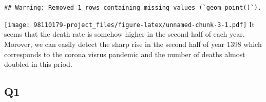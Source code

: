 \documentclass[
]{article}
\newenvironment{Shaded}{\begin{snugshade}}{\end{snugshade}}
\newcommand{\AttributeTok}[1]{\textcolor[rgb]{0.77,0.63,0.00}{#1}}
\newcommand{\CommentTok}[1]{\textcolor[rgb]{0.56,0.35,0.01}{\textit{#1}}}
\newcommand{\DecValTok}[1]{\textcolor[rgb]{0.00,0.00,0.81}{#1}}
\newcommand{\FunctionTok}[1]{\textcolor[rgb]{0.00,0.00,0.00}{#1}}
\newcommand{\NormalTok}[1]{#1}
\newcommand{\OtherTok}[1]{\textcolor[rgb]{0.56,0.35,0.01}{#1}}
\newcommand{\SpecialCharTok}[1]{\textcolor[rgb]{0.00,0.00,0.00}{#1}}
\newcommand{\StringTok}[1]{\textcolor[rgb]{0.31,0.60,0.02}{#1}}
\begin{document}
\begin{Shaded}
\end{Shaded}

\begin{verbatim}
## Warning: Removed 1 rows containing missing values (`geom_point()`).
\end{verbatim}

\texttt{[image: 98110179-project\_files/figure-latex/unnamed-chunk-3-1.pdf]}
It seems that the death rate is somehow higher in the second half of
each year. Morover, we can easily detect the sharp rise in the second
half of year 1398 which corresponds to the corona visrus pandemic and
the number of deaths almost doubled in this priod.

\hypertarget{q1}{%
\subsection{Q1}\label{q1}}
\end{document}
